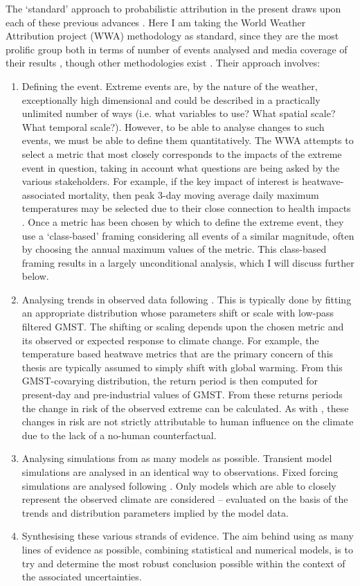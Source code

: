     The `standard' approach to probabilistic attribution in the present draws upon each of these previous advances \citep{philip_protocol_2020}. Here I am taking the World Weather Attribution project (WWA) methodology as standard, since they are the most prolific group both in terms of number of events analysed and media coverage of their results \citep{van_oldenborgh_pathways_2021}, though other methodologies exist \citep{lewis_anthropogenic_2013}. Their approach involves:
    \begin{enumerate}
      \item Defining the event. Extreme events are, by the nature of the weather, exceptionally high dimensional and could be described in a practically unlimited number of ways (i.e. what variables to use? What spatial scale? What temporal scale?). However, to be able to analyse changes to such events, we must be able to define them quantitatively. The WWA attempts to select a metric that most closely corresponds to the impacts of the extreme event in question, taking in account what questions are being asked by the various stakeholders. For example, if the key impact of interest is heatwave-associated mortality, then peak 3-day moving average daily maximum temperatures may be selected due to their close connection to health impacts \citep{dippoliti_impact_2010}. Once a metric has been chosen by which to define the extreme event, they use a `class-based' framing considering all events of a similar magnitude, often by choosing the annual maximum values of the metric. This class-based framing results in a largely unconditional analysis, which I will discuss further below.
      \item Analysing trends in observed data following \citet{van_oldenborgh_how_2007}. This is typically done by fitting an appropriate distribution whose parameters shift or scale with low-pass filtered GMST. The shifting or scaling depends upon the chosen metric and its observed or expected response to climate change. For example, the temperature based heatwave metrics that are the primary concern of this thesis are typically assumed to simply shift with global warming. From this GMST-covarying distribution, the return period is then computed for present-day and pre-industrial values of GMST. From these returns periods the change in risk of the observed extreme can be calculated. As with \citet{van_oldenborgh_how_2007}, these changes in risk are not strictly attributable to human influence on the climate due to the lack of a no-human counterfactual.
      \item Analysing simulations from as many models as possible. Transient model simulations are analysed in an identical way to observations. Fixed forcing simulations are analysed following \citet{pall_anthropogenic_2011}. Only models which are able to closely represent the observed climate are considered -- evaluated on the basis of the trends and distribution parameters implied by the model data.
      \item Synthesising these various strands of evidence. The aim behind using as many lines of evidence as possible, combining statistical and numerical models, is to try and determine the most robust conclusion possible within the context of the associated uncertainties. 
    \end{enumerate}
